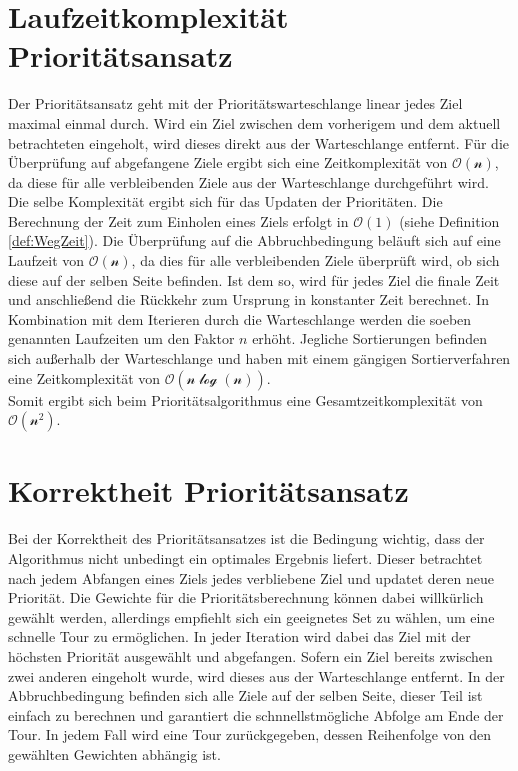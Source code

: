 \documentclass[german,version-2019-11]{uzl-thesis}
\begin{document}
\section{Laufzeitkomplexität Prioritätsansatz}

Der Prioritätsansatz geht mit der Prioritätswarteschlange linear jedes Ziel maximal einmal durch. Wird ein Ziel zwischen dem vorherigem und dem aktuell betrachteten eingeholt, wird dieses direkt aus der Warteschlange entfernt. 
Für die Überprüfung auf abgefangene Ziele ergibt sich eine Zeitkomplexität von $\mathcal{O(n)}$, da diese für alle verbleibenden Ziele aus der Warteschlange durchgeführt wird. Die selbe Komplexität ergibt sich für das Updaten der Prioritäten. Die Berechnung der Zeit zum Einholen eines Ziels erfolgt in $\mathcal{O(1)}$ (siehe Definition \ref{def:WegZeit}). Die Überprüfung auf die Abbruchbedingung beläuft sich auf eine Laufzeit von $\mathcal{O(n)}$, da dies für alle verbleibenden Ziele überprüft wird, ob sich diese auf der selben Seite befinden. Ist dem so, wird für jedes Ziel die finale Zeit und anschließend die Rückkehr zum Ursprung in konstanter Zeit berechnet. In Kombination mit dem Iterieren durch die Warteschlange werden die soeben genannten Laufzeiten um den Faktor $n$ erhöht. Jegliche Sortierungen befinden sich außerhalb der Warteschlange und haben mit einem gängigen Sortierverfahren \cite{kaaser2014algorithmen} eine Zeitkomplexität von $\mathcal{O(n\log(n))}$. \\
Somit ergibt sich beim Prioritätsalgorithmus eine Gesamtzeitkomplexität von $\mathcal{O(n^2)}$.

\section{Korrektheit Prioritätsansatz}
Bei der Korrektheit des Prioritätsansatzes ist die Bedingung wichtig, dass der Algorithmus nicht unbedingt ein optimales Ergebnis liefert. Dieser betrachtet nach jedem Abfangen eines Ziels jedes verbliebene Ziel und updatet deren neue Priorität. Die Gewichte für die Prioritätsberechnung können dabei willkürlich gewählt werden, allerdings empfiehlt sich ein geeignetes Set zu wählen, um eine schnelle Tour zu ermöglichen. In jeder Iteration wird dabei das Ziel mit der höchsten Priorität ausgewählt und abgefangen. Sofern ein Ziel bereits zwischen zwei anderen eingeholt wurde, wird dieses aus der Warteschlange entfernt. In der Abbruchbedingung befinden sich alle Ziele auf der selben Seite, dieser Teil ist einfach zu berechnen und garantiert die schnnellstmögliche Abfolge am Ende der Tour. In jedem Fall wird eine Tour zurückgegeben, dessen Reihenfolge von den gewählten Gewichten abhängig ist.
\end{document}
